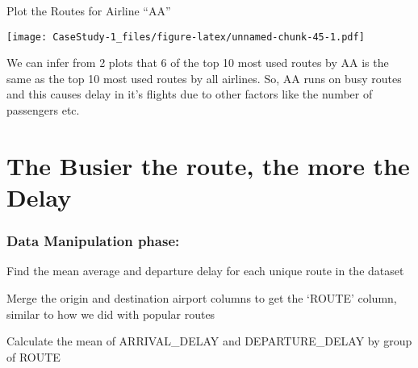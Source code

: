 \documentclass[]{article}
\newenvironment{Shaded}{\begin{snugshade}}{\end{snugshade}}
\newcommand{\CharTok}[1]{\textcolor[rgb]{0.31,0.60,0.02}{#1}}
\newcommand{\DataTypeTok}[1]{\textcolor[rgb]{0.13,0.29,0.53}{#1}}
\newcommand{\DecValTok}[1]{\textcolor[rgb]{0.00,0.00,0.81}{#1}}
\newcommand{\KeywordTok}[1]{\textcolor[rgb]{0.13,0.29,0.53}{\textbf{#1}}}
\newcommand{\NormalTok}[1]{#1}
\newcommand{\OperatorTok}[1]{\textcolor[rgb]{0.81,0.36,0.00}{\textbf{#1}}}
\newcommand{\StringTok}[1]{\textcolor[rgb]{0.31,0.60,0.02}{#1}}
\begin{document}
Plot the Routes for Airline ``AA''

\begin{Shaded}
\end{Shaded}

\texttt{[image: CaseStudy-1\_files/figure-latex/unnamed-chunk-45-1.pdf]}

We can infer from 2 plots that 6 of the top 10 most used routes by AA is
the same as the top 10 most used routes by all airlines. So, AA runs on
busy routes and this causes delay in it's flights due to other factors
like the number of passengers etc.

\hypertarget{the-busier-the-route-the-more-the-delay}{%
\section{The Busier the route, the more the
Delay}\label{the-busier-the-route-the-more-the-delay}}

\hypertarget{data-manipulation-phase}{%
\subsubsection{Data Manipulation phase:}\label{data-manipulation-phase}}

Find the mean average and departure delay for each unique route in the
dataset

Merge the origin and destination airport columns to get the `ROUTE'
column, similar to how we did with popular routes

Calculate the mean of ARRIVAL\_DELAY and DEPARTURE\_DELAY by group of
ROUTE
\end{document}
